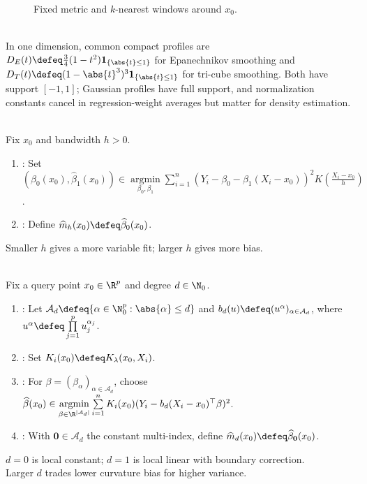 \begin{figure}[H]
  \centering
  
  \caption{Fixed metric and $k$-nearest windows around $x_0$.}
  \label{fig:kernel-smoothing-windows}
\end{figure}

\begin{example} \label{ex:compact-kernels-for-local-smoothing} \\
In one dimension, common compact profiles are $D_E(t)\defeq\frac34(1-t^2)\mathbf{1}_{\{\abs{t}\leq1\}}$ for Epanechnikov smoothing and $D_T(t)\defeq(1-\abs{t}^3)^3\mathbf{1}_{\{\abs{t}\leq1\}}$ for tri-cube smoothing.
Both have support $[-1,1]$; Gaussian profiles have full support, and normalization constants cancel in regression-weight averages but matter for density estimation.
\end{example}

\begin{method} \label{meth:local-linear-regression-smoothing} \\
Fix $x_0$ and bandwidth $h>0$.
\begin{enumerate}[label=(\roman*)]
\setlength{\itemsep}{0pt}
\item {}: Set $(\widehat{\beta}_0(x_0),\widehat{\beta}_1(x_0))\in\operatorname*{argmin}\limits_{\beta_0,\beta_1}\sum\limits_{i=1}^n(Y_i-\beta_0-\beta_1(X_i-x_0))^2K(\frac{X_i-x_0}{h})$.
\item {}: Define $\widehat{m}_h(x_0)\defeq\widehat{\beta}_0(x_0)$.
\end{enumerate}
Smaller $h$ gives a more variable fit; larger $h$ gives more bias.
\end{method}

\begin{method} \label{meth:local-polynomial-regression-smoothing} \\
Fix a query point $x_0\in\R^p$ and degree $d\in\N_0$.
\begin{enumerate}[label=(\roman*)]
\setlength{\itemsep}{0pt}
\item {}: Let $\mathcal{A}_d\defeq\{\alpha\in\N_0^p:\abs{\alpha}\leq d\}$ and $b_d(u)\defeq(u^\alpha)_{\alpha\in\mathcal{A}_d}$, where $u^\alpha\defeq\prod\limits_{j=1}^pu_j^{\alpha_j}$.
\item {}: Set $K_i(x_0)\defeq K_\lambda(x_0,X_i)$.
\item {}: For $\beta=(\beta_\alpha)_{\alpha\in\mathcal{A}_d}$, choose $\widehat{\beta}(x_0)\in\operatorname*{argmin}\limits_{\beta\in\R^{|\mathcal{A}_d|}}\sum\limits_{i=1}^nK_i(x_0)(Y_i-b_d(X_i-x_0)^\top\beta)^2$.
\item {}: With $\mathbf{0}\in\mathcal{A}_d$ the constant multi-index, define $\widehat{m}_d(x_0)\defeq\widehat{\beta}_{\mathbf{0}}(x_0)$.
\end{enumerate}
$d=0$ is local constant; $d=1$ is local linear with boundary correction.\\
Larger $d$ trades lower curvature bias for higher variance.
\end{method}

